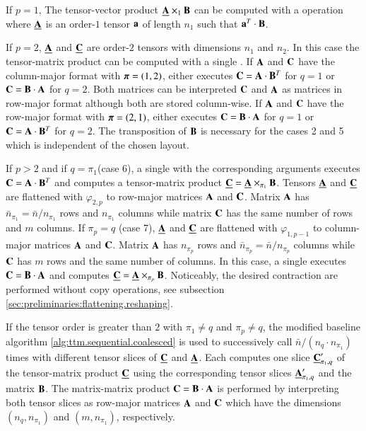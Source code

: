 If $p=1$, The tensor-vector product $\underline{\mathbf{A}} \times_1 \mathbf{B}$ can be computed with a  operation where $\underline{\mathbf{A}}$ is an order-$1$ tensor $\mathbf{a}$ of length $n_1$ such that $\mathbf{a}^T \cdot \mathbf{B}$.

If $p=2$, $\underline{\mathbf{A}}$ and $\underline{\mathbf{C}}$ are order-$2$ tensors with dimensions $n_1$ and $n_2$.
In this case the tensor-matrix product can be computed with a single .
If $\mathbf{A}$ and $\mathbf{C}$ have the column-major format with $\boldsymbol{\pi}=(1,2)$,  either executes $\mathbf{C} = \mathbf{A} \cdot \mathbf{B}^T$ for $q =1$ or $\mathbf{C} = \mathbf{B} \cdot \mathbf{A}$ for $q=2$.
Both matrices can be interpreted $\mathbf{C}$ and $\mathbf{A}$ as matrices in row-major format although both are stored column-wise.
If $\mathbf{A}$ and $\mathbf{C}$ have the row-major format with $\boldsymbol{\pi}=(2,1)$,  either executes $\mathbf{C} = \mathbf{B} \cdot \mathbf{A}$ for $q =1$ or $\mathbf{C} = \mathbf{A} \cdot \mathbf{B}^T$ for $q=2$. 
The transposition of $\mathbf{B}$ is necessary for the cases 2 and 5 which is independent of the chosen layout.

If $p>2$ and if $q=\pi_1$(case 6), a single  with the corresponding arguments executes $\mathbf{C} = \mathbf{A} \cdot \mathbf{B}^T$ and computes a tensor-matrix product $\underline{\mathbf{C}} = \underline{\mathbf{A}} \times_{\pi_1} \mathbf{B}$.
Tensors $\underline{\mathbf{A}}$ and $\underline{\mathbf{C}}$ are flattened with $\varphi_{2,p}$ to row-major matrices $\mathbf{A}$ and $\mathbf{C}$.
Matrix $\mathbf{A}$ has $\bar{n}_{\pi_1} = \bar{n} / n_{\pi_1}$ rows and $n_{\pi_1}$ columns while matrix $\mathbf{C}$ has the same number of rows and $m$ columns.
If $\pi_p=q$ (case 7), $\underline{\mathbf{A}}$ and $\underline{\mathbf{C}}$ are flattened with $\varphi_{1,p-1}$ to column-major matrices $\mathbf{A}$ and $\mathbf{C}$.
Matrix $\mathbf{A}$ has $n_{\pi_p}$ rows and $\bar{n}_{\pi_p} =  \bar{n} / n_{\pi_p}$ columns while $\mathbf{C}$ has $m$ rows and the same number of columns.
In this case, a single  executes $\mathbf{C} = \mathbf{B} \cdot \mathbf{A}$ and computes $\underline{\mathbf{C}} = \underline{\mathbf{A}} \times_{\pi_p} \mathbf{B}$.
Noticeably, the desired contraction are performed without copy operations, see subsection \ref{sec:preliminaries:flattening.reshaping}. 

If the tensor order is greater than $2$ with $\pi_1\neq q$ and $\pi_p \neq q$, the modified baseline algorithm \ref{alg:ttm.sequential.coalesced} is used to successively call $\bar{n} / (n_q \cdot n_{\pi_1})$ times  with different tensor slices of $\underline{\mathbf{C}}$ and $\underline{\mathbf{A}}$.
Each  computes one slice $\underline{\mathbf{C}}_{\pi_1,q}'$ of the tensor-matrix product $\underline{\mathbf{C}}$ using the corresponding tensor slices $\underline{\mathbf{A}}_{\pi_1,q}'$ and the matrix $\mathbf{B}$.
The matrix-matrix product $\mathbf{C} = \mathbf{B} \cdot \mathbf{A}$ is performed by interpreting both tensor slices as row-major matrices $\mathbf{A}$ and $\mathbf{C}$ which have the dimensions $(n_q,n_{\pi_1})$ and $(m,n_{\pi_1})$, respectively.

